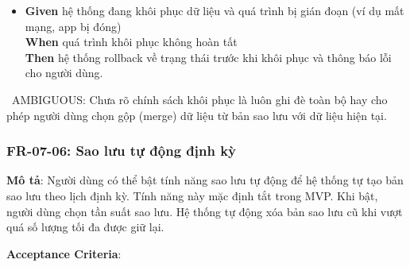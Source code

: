 \begin{itemize}
\item \textbf{Given} hệ thống đang khôi phục dữ liệu và quá trình bị gián đoạn (ví dụ mất mạng, app bị đóng)  \\ \hspace*{1.5em}  \textbf{When} quá trình khôi phục không hoàn tất  \\ \hspace*{1.5em}  \textbf{Then} hệ thống rollback về trạng thái trước khi khôi phục và thông báo lỗi cho người dùng.
\end{itemize}
\warningicon\  AMBIGUOUS: Chưa rõ chính sách khôi phục là luôn ghi đè toàn bộ hay cho phép người dùng chọn gộp (merge) dữ liệu từ bản sao lưu với dữ liệu hiện tại.



\subsubsection{FR-07-06: Sao lưu tự động định kỳ}

\textbf{Mô tả}: Người dùng có thể bật tính năng sao lưu tự động để hệ thống tự tạo bản sao lưu theo lịch định kỳ. Tính năng này mặc định tắt trong MVP. Khi bật, người dùng chọn tần suất sao lưu. Hệ thống tự động xóa bản sao lưu cũ khi vượt quá số lượng tối đa được giữ lại.



\textbf{Acceptance Criteria}:

